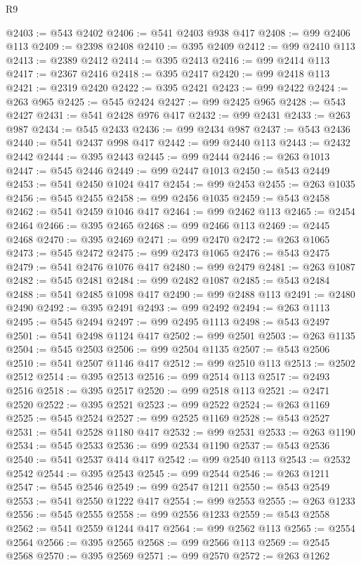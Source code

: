 \begin{lexlean}{R9}
\begin{coremodule}
{{{{{{{{{{{{{{{{{{{{{{{{{{{{{{{{{{{{{{{{{{{{{{{{{{{{{{{{{{{{{{{{{{{{{{{{{{{{{{{{{{{{@2403 := @543 @2402
@2406 := @541 @2403 @938 @417
@2408 := @99 @2406 @113
@2409 := @2398 @2408
@2410 := @395 @2409
@2412 := @99 @2410 @113
@2413 := @2389 @2412
@2414 := @395 @2413
@2416 := @99 @2414 @113
@2417 := @2367 @2416
@2418 := @395 @2417
@2420 := @99 @2418 @113
@2421 := @2319 @2420
@2422 := @395 @2421
@2423 := @99 @2422
@2424 := @263 @965
@2425 := @545 @2424
@2427 := @99 @2425 @965
@2428 := @543 @2427
@2431 := @541 @2428 @976 @417
@2432 := @99 @2431
@2433 := @263 @987
@2434 := @545 @2433
@2436 := @99 @2434 @987
@2437 := @543 @2436
@2440 := @541 @2437 @998 @417
@2442 := @99 @2440 @113
@2443 := @2432 @2442
@2444 := @395 @2443
@2445 := @99 @2444
@2446 := @263 @1013
@2447 := @545 @2446
@2449 := @99 @2447 @1013
@2450 := @543 @2449
@2453 := @541 @2450 @1024 @417
@2454 := @99 @2453
@2455 := @263 @1035
@2456 := @545 @2455
@2458 := @99 @2456 @1035
@2459 := @543 @2458
@2462 := @541 @2459 @1046 @417
@2464 := @99 @2462 @113
@2465 := @2454 @2464
@2466 := @395 @2465
@2468 := @99 @2466 @113
@2469 := @2445 @2468
@2470 := @395 @2469
@2471 := @99 @2470
@2472 := @263 @1065
@2473 := @545 @2472
@2475 := @99 @2473 @1065
@2476 := @543 @2475
@2479 := @541 @2476 @1076 @417
@2480 := @99 @2479
@2481 := @263 @1087
@2482 := @545 @2481
@2484 := @99 @2482 @1087
@2485 := @543 @2484
@2488 := @541 @2485 @1098 @417
@2490 := @99 @2488 @113
@2491 := @2480 @2490
@2492 := @395 @2491
@2493 := @99 @2492
@2494 := @263 @1113
@2495 := @545 @2494
@2497 := @99 @2495 @1113
@2498 := @543 @2497
@2501 := @541 @2498 @1124 @417
@2502 := @99 @2501
@2503 := @263 @1135
@2504 := @545 @2503
@2506 := @99 @2504 @1135
@2507 := @543 @2506
@2510 := @541 @2507 @1146 @417
@2512 := @99 @2510 @113
@2513 := @2502 @2512
@2514 := @395 @2513
@2516 := @99 @2514 @113
@2517 := @2493 @2516
@2518 := @395 @2517
@2520 := @99 @2518 @113
@2521 := @2471 @2520
@2522 := @395 @2521
@2523 := @99 @2522
@2524 := @263 @1169
@2525 := @545 @2524
@2527 := @99 @2525 @1169
@2528 := @543 @2527
@2531 := @541 @2528 @1180 @417
@2532 := @99 @2531
@2533 := @263 @1190
@2534 := @545 @2533
@2536 := @99 @2534 @1190
@2537 := @543 @2536
@2540 := @541 @2537 @414 @417
@2542 := @99 @2540 @113
@2543 := @2532 @2542
@2544 := @395 @2543
@2545 := @99 @2544
@2546 := @263 @1211
@2547 := @545 @2546
@2549 := @99 @2547 @1211
@2550 := @543 @2549
@2553 := @541 @2550 @1222 @417
@2554 := @99 @2553
@2555 := @263 @1233
@2556 := @545 @2555
@2558 := @99 @2556 @1233
@2559 := @543 @2558
@2562 := @541 @2559 @1244 @417
@2564 := @99 @2562 @113
@2565 := @2554 @2564
@2566 := @395 @2565
@2568 := @99 @2566 @113
@2569 := @2545 @2568
@2570 := @395 @2569
@2571 := @99 @2570
@2572 := @263 @1262
}}}}}}}}}}}}}}}}}}}}}}}}}}}}}}}}}}}}}}}}}}}}}}}}}}}}}}}}}}}}}}}}}}}}}}}}}}}}}}}}}}}}
\end{coremodule}
\end{lexlean}
